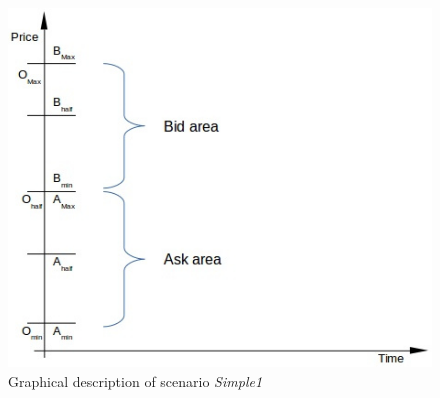 \documentclass[a4paper,11pt]{article}
\begin{document}
\begin{figure}[!hbpt]
  \centering
  \includegraphics[scale=0.5]{Simple1}
  \caption{Graphical description of scenario {\em Simple1}}
  \label{fig:Simple1}
\end{figure}    
\end{document}
